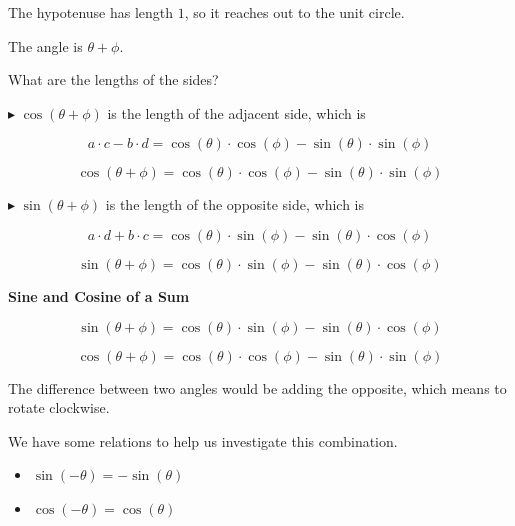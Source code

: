 \documentclass{ximera}
\begin{document}
The hypotenuse has length $1$, so it reaches out to the unit circle.

The angle is $\theta + \phi$.


What are the lengths of the sides?




 

\textcolor{red!70!black}{$\blacktriangleright$} $\cos(\theta + \phi)$ is the length of the adjacent side, which is 


\[  a \cdot c - b \cdot d = \cos(\theta) \cdot \cos(\phi) - \sin(\theta) \cdot \sin(\phi)  \]


\[  \cos(\theta + \phi) = \cos(\theta) \cdot \cos(\phi) - \sin(\theta) \cdot \sin(\phi)  \]







 

\textcolor{red!70!black}{$\blacktriangleright$} $\sin(\theta + \phi)$ is the length of the opposite side, which is 


\[  a \cdot d + b \cdot c = \cos(\theta) \cdot \sin(\phi) - \sin(\theta) \cdot \cos(\phi)  \]


\[  \sin(\theta + \phi) = \cos(\theta) \cdot \sin(\phi) - \sin(\theta) \cdot \cos(\phi)  \]














\begin{theorem}  \textbf{\textcolor{-red!75!green}{Sine and Cosine of a Sum}}

\[  \sin(\theta + \phi) = \cos(\theta) \cdot \sin(\phi) - \sin(\theta) \cdot \cos(\phi)  \]

\[  \cos(\theta + \phi) = \cos(\theta) \cdot \cos(\phi) - \sin(\theta) \cdot \sin(\phi)  \]

\end{theorem}




The difference between two angles would be adding the opposite, which means to rotate clockwise.

We have some relations to help us investigate this combination.



\begin{itemize}
\item $\sin(-\theta) = -\sin(\theta)$
\item $\cos(-\theta) = \cos(\theta)$
\end{itemize}
\end{document}

